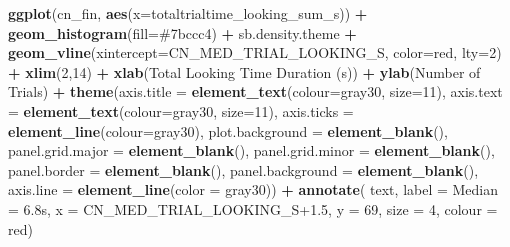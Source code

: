\documentclass[
  doc,floatsintext]{apa6}
\newenvironment{Shaded}{\begin{snugshade}}{\end{snugshade}}
\newcommand{\AttributeTok}[1]{\textcolor[rgb]{0.13,0.29,0.53}{#1}}
\newcommand{\DecValTok}[1]{\textcolor[rgb]{0.00,0.00,0.81}{#1}}
\newcommand{\FloatTok}[1]{\textcolor[rgb]{0.00,0.00,0.81}{#1}}
\newcommand{\FunctionTok}[1]{\textcolor[rgb]{0.13,0.29,0.53}{\textbf{#1}}}
\newcommand{\NormalTok}[1]{#1}
\newcommand{\SpecialCharTok}[1]{\textcolor[rgb]{0.81,0.36,0.00}{\textbf{#1}}}
\newcommand{\StringTok}[1]{\textcolor[rgb]{0.31,0.60,0.02}{#1}}
\begin{document}
\begin{Shaded}
\begin{Highlighting}[]
\FunctionTok{ggplot}\NormalTok{(cn\_fin, }\FunctionTok{aes}\NormalTok{(}\AttributeTok{x=}\NormalTok{totaltrialtime\_looking\_sum\_s)) }\SpecialCharTok{+}
  \FunctionTok{geom\_histogram}\NormalTok{(}\AttributeTok{fill=}\StringTok{\textquotesingle{}\#7bccc4\textquotesingle{}}\NormalTok{) }\SpecialCharTok{+}
\NormalTok{  sb.density.theme }\SpecialCharTok{+}
  \FunctionTok{geom\_vline}\NormalTok{(}\AttributeTok{xintercept=}\NormalTok{CN\_MED\_TRIAL\_LOOKING\_S, }
             \AttributeTok{color=}\StringTok{\textquotesingle{}red\textquotesingle{}}\NormalTok{, }\AttributeTok{lty=}\DecValTok{2}\NormalTok{) }\SpecialCharTok{+}
  \FunctionTok{xlim}\NormalTok{(}\DecValTok{2}\NormalTok{,}\DecValTok{14}\NormalTok{) }\SpecialCharTok{+}
  \FunctionTok{xlab}\NormalTok{(}\StringTok{\textquotesingle{}Total Looking Time Duration (s)\textquotesingle{}}\NormalTok{) }\SpecialCharTok{+}
  \FunctionTok{ylab}\NormalTok{(}\StringTok{\textquotesingle{}Number of Trials\textquotesingle{}}\NormalTok{) }\SpecialCharTok{+} 
  \FunctionTok{theme}\NormalTok{(}\AttributeTok{axis.title =} \FunctionTok{element\_text}\NormalTok{(}\AttributeTok{colour=}\StringTok{\textquotesingle{}gray30\textquotesingle{}}\NormalTok{, }\AttributeTok{size=}\DecValTok{11}\NormalTok{),}
        \AttributeTok{axis.text =} \FunctionTok{element\_text}\NormalTok{(}\AttributeTok{colour=}\StringTok{\textquotesingle{}gray30\textquotesingle{}}\NormalTok{, }\AttributeTok{size=}\DecValTok{11}\NormalTok{),}
        \AttributeTok{axis.ticks =} \FunctionTok{element\_line}\NormalTok{(}\AttributeTok{colour=}\StringTok{\textquotesingle{}gray30\textquotesingle{}}\NormalTok{),}
        \AttributeTok{plot.background =} \FunctionTok{element\_blank}\NormalTok{(),}
        \AttributeTok{panel.grid.major =} \FunctionTok{element\_blank}\NormalTok{(),}
        \AttributeTok{panel.grid.minor =} \FunctionTok{element\_blank}\NormalTok{(),}
        \AttributeTok{panel.border =} \FunctionTok{element\_blank}\NormalTok{(),}
        \AttributeTok{panel.background =} \FunctionTok{element\_blank}\NormalTok{(),}
        \AttributeTok{axis.line =} \FunctionTok{element\_line}\NormalTok{(}\AttributeTok{color =} \StringTok{\textquotesingle{}gray30\textquotesingle{}}\NormalTok{))  }\SpecialCharTok{+}
  \FunctionTok{annotate}\NormalTok{(}
    \StringTok{\textquotesingle{}text\textquotesingle{}}\NormalTok{, }\AttributeTok{label =} \StringTok{\textquotesingle{}Median = 6.8s\textquotesingle{}}\NormalTok{,}
    \AttributeTok{x =}\NormalTok{ CN\_MED\_TRIAL\_LOOKING\_S}\FloatTok{+1.5}\NormalTok{, }\AttributeTok{y =} \DecValTok{69}\NormalTok{, }\AttributeTok{size =} \DecValTok{4}\NormalTok{, }\AttributeTok{colour =} \StringTok{\textquotesingle{}red\textquotesingle{}}\NormalTok{)}
\end{Highlighting}
\end{Shaded}
\end{document}
